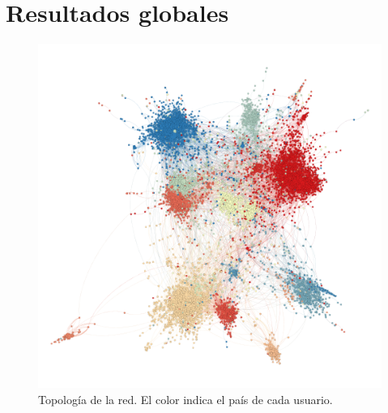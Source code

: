 \section{Resultados globales}


\begin{figure}[ht]
    \centerfloat
    \includegraphics[width=1.3\textwidth]{img/resultados/grado-targets.png}
    \caption{Topología de la red. El color indica el país de cada usuario.}
\end{figure}

